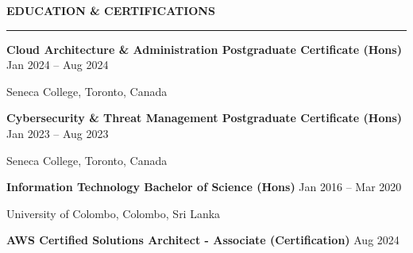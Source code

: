 \documentclass[10pt,letterpaper]{article}
\begin{document}
\vspace{6pt}

\textbf{EDUCATION \& CERTIFICATIONS}\\[-8pt]
\noindent\rule{\textwidth}{1pt}

\vspace{-2pt}

\textbf{Cloud Architecture \& Administration Postgraduate Certificate (Hons)} \hfill Jan 2024 -- Aug 2024

Seneca College, Toronto, Canada

\textbf{Cybersecurity \& Threat Management Postgraduate Certificate (Hons)} \hfill Jan 2023 -- Aug 2023

Seneca College, Toronto, Canada

\textbf{Information Technology Bachelor of Science (Hons)} \hfill Jan 2016 -- Mar 2020

University of Colombo, Colombo, Sri Lanka

\textbf{AWS Certified Solutions Architect - Associate (Certification)} \hfill Aug 2024
\end{document}
